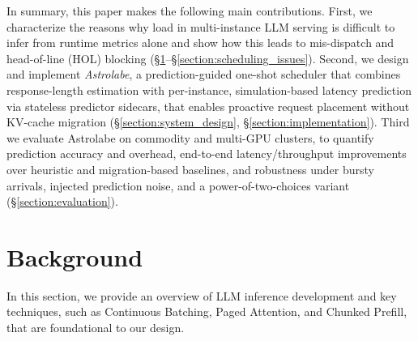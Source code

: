\documentclass[sigconf, review, anonymous]{acmart}
\begin{document}

In summary, this paper makes the following main contributions. First, we characterize the reasons why load in multi-instance LLM serving is difficult to infer from runtime metrics alone and show how this leads to mis-dispatch and head-of-line (HOL) blocking (\S\ref{section:motivation}--\S\ref{section:scheduling_issues}). Second, we design and implement \emph{Astrolabe}, a prediction-guided one-shot scheduler that combines response-length estimation with per-instance, simulation-based latency prediction via stateless predictor sidecars, that enables proactive request placement without KV-cache migration (\S\ref{section:system_design}, \S\ref{section:implementation}).
Third we evaluate Astrolabe on commodity and multi-GPU clusters, to quantify prediction accuracy and overhead, end-to-end latency/throughput improvements over heuristic and migration-based baselines, and robustness under bursty arrivals, injected prediction noise, and a power-of-two-choices variant (\S\ref{section:evaluation}).




\section{Background}\label{section:motivation}
In this section, we provide an overview of LLM inference development and key techniques, such as Continuous Batching, Paged Attention, and Chunked Prefill, that are foundational to our design.
\end{document}
